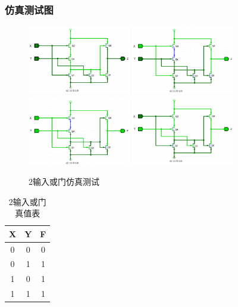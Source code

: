 \documentclass{article}
\begin{document}
    \subsubsection{仿真测试图}
    \begin{figure}[H]
    \centering
    \includegraphics[width=0.4\textwidth]{2.5.1.png}
    \includegraphics[width=0.4\textwidth]{2.5.2.png}
    \includegraphics[width=0.4\textwidth]{2.5.3.png}
    \includegraphics[width=0.4\textwidth]{2.5.4.png}
    \caption{2输入或门仿真测试}
    \end{figure}

    \begin{table}[H]
    \centering
    \begin{tabular}{|c c|c|}
        \hline
        X & Y & F \\ \hline
        0 & 0 & 0 \\ \hline
        0 & 1 & 1 \\ \hline
        1 & 0 & 1 \\ \hline
        1 & 1 & 1 \\ \hline
    \end{tabular}
    \caption{2输入或门真值表}
    \end{table}
\end{document}
